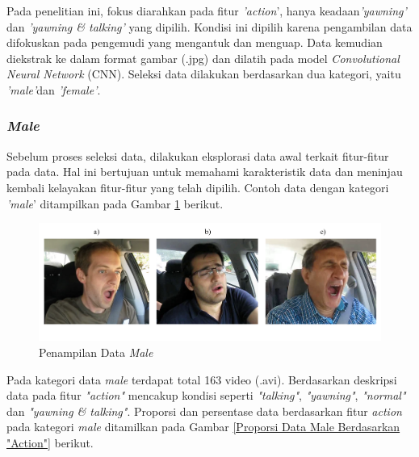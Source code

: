    
   Pada penelitian ini, fokus diarahkan pada fitur \textit{'action}', hanya keadaan\textit{'yawning'} dan \textit{'yawning \& talking'}  yang dipilih. Kondisi ini dipilih karena pengambilan data difokuskan pada pengemudi yang mengantuk dan menguap. Data kemudian diekstrak ke dalam format gambar (.jpg) dan dilatih pada model \textit{Convolutional Neural Network} (CNN). Seleksi data dilakukan berdasarkan dua kategori, yaitu \textit{'male'}dan \textit{'female'}.

\subsubsection{\textit{Male}}
          Sebelum proses seleksi data, dilakukan eksplorasi data awal terkait fitur-fitur pada data. Hal ini bertujuan untuk memahami karakteristik data dan meninjau kembali kelayakan fitur-fitur yang telah dipilih. Contoh data dengan kategori \textit{'male}' ditampilkan pada Gambar \ref{male gambar1} berikut.
       
     \begin{figure}[H]
         \centering
             \includegraphics[width=\textwidth]{figures/bab4/male_contoh.png}
             \caption{Penampilan Data \textit{Male}}
             \label{male gambar1}
     \end{figure}

    Pada kategori data \textit{male} terdapat total 163 video (.avi). Berdasarkan deskripsi data pada fitur \textit{"action"} mencakup kondisi seperti \textit{"talking"}, \textit{"yawning"}, \textit{"normal"} dan \textit{"yawning \& talking"}. Proporsi dan persentase data berdasarkan fitur \textit{action} pada kategori \textit{male} ditamilkan pada Gambar \ref{Proporsi Data Male Berdasarkan "Action"} berikut.
    

   


